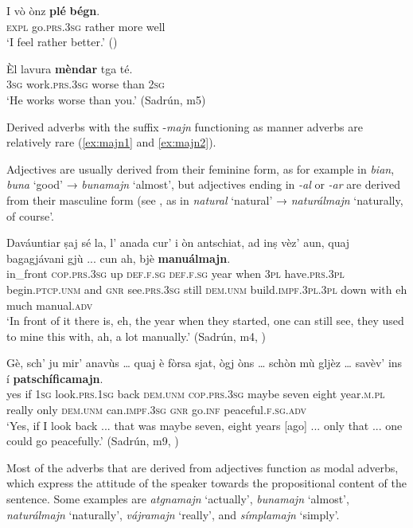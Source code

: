 \ea
\label{ex:plebegn1}
\gll  I vò ònz \textbf{plé} \textbf{bégn}. \\
\textsc{expl} go.\textsc{prs.3sg} rather more well\\
\glt `I feel rather better.' ()
\z

\ea
\label{ex:mendar1}
\gll Èl lavura \textbf{mèndar} tga té.\\
\textsc{3sg} work.\textsc{prs.3sg} worse than \textsc{2sg}\\
\glt `He works worse than you.' (Sadrún, m5)
\z

Derived adverbs with the suffix -\textit{majn} functioning as manner adverbs are relatively rare (\ref{ex:majn1} and \ref{ex:majn2}).

Adjectives are usually derived from their feminine form, as for example in \textit{bian}, \textit{buna} `good' → \textit{bunamajn} `almost', but adjectives ending in \textit{-al} or \textit{-ar} are derived from their masculine form (see \citet[494]{Spescha1989}, as in \textit{natural} `natural' → \textit{naturálmajn} `naturally, of course'.

\ea
\label{ex:majn1}
\gll Daváuntiar ṣaj sé la, l’ anada cur' i òn antschiat, ad inṣ vèz’ aun, quaj bagagjávani gjù ... cun ah, bjè \textbf{manuálmajn}.   \\
in\_front  \textsc{cop.prs.3sg} up \textsc{def.f.sg} \textsc{def.f.sg} year when \textsc{3pl} have.\textsc{prs.3pl} begin.\textsc{ptcp.unm} and \textsc{gnr}  see.\textsc{prs.3sg} still  \textsc{dem.unm} build.\textsc{impf.3pl.3pl} down {} with eh much manual.\textsc{adv}\\
\glt `In front of it there is, eh, the year when they started, one can still see, they used to mine this with, ah, a lot manually.' (Sadrún, m4, )
\z

\ea
\label{ex:majn2}
\gll Gè, sch’ ju mir’ anavùs … quaj è fòrsa sjat, ògj òns … schòn mù gljèz … savèv’ ins í \textbf{patschíficamajn}.   \\
yes if \textsc{1sg} look.\textsc{prs.1sg} back {} \textsc{dem.unm} \textsc{cop.prs.3sg} maybe seven eight year.\textsc{m.pl} {} really only \textsc{dem.unm} {} can.\textsc{impf.3sg} \textsc{gnr} go.\textsc{inf} peaceful.\textsc{f.sg.adv}\\
\glt `Yes, if I look back ... that was maybe seven, eight years [ago] ... only that ... one could go peacefully.' (Sadrún, m9, )
\z

Most of the adverbs that are derived from adjectives function as modal adverbs, which express the attitude of the speaker towards the propositional content of the sentence. Some examples are \textit{atgnamajn} `actually', \textit{bunamajn} `almost', \textit{naturálmajn} `naturally', \textit{vájramajn} `really', and \textit{símplamajn} `simply'.


